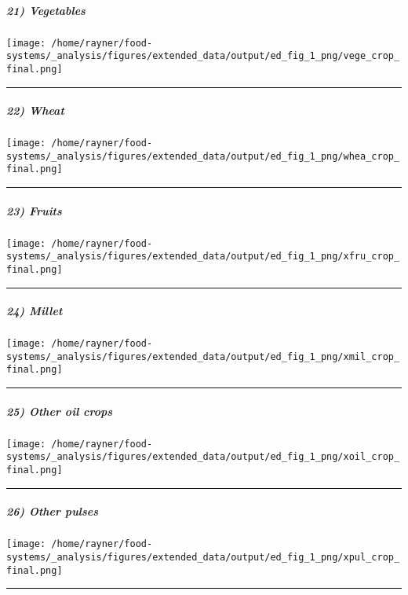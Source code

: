 \documentclass[
]{article}
\begin{document}
\hypertarget{vegetables}{%
\subparagraph{21) Vegetables}\label{vegetables}}

\texttt{[image: /home/rayner/food-systems/\_analysis/figures/extended\_data/output/ed\_fig\_1\_png/vege\_crop\_final.png]}

\begin{center}\rule{0.5\linewidth}{0.5pt}\end{center}

\hypertarget{wheat}{%
\subparagraph{22) Wheat}\label{wheat}}

\texttt{[image: /home/rayner/food-systems/\_analysis/figures/extended\_data/output/ed\_fig\_1\_png/whea\_crop\_final.png]}

\begin{center}\rule{0.5\linewidth}{0.5pt}\end{center}

\hypertarget{fruits}{%
\subparagraph{23) Fruits}\label{fruits}}

\texttt{[image: /home/rayner/food-systems/\_analysis/figures/extended\_data/output/ed\_fig\_1\_png/xfru\_crop\_final.png]}

\begin{center}\rule{0.5\linewidth}{0.5pt}\end{center}

\hypertarget{millet}{%
\subparagraph{24) Millet}\label{millet}}

\texttt{[image: /home/rayner/food-systems/\_analysis/figures/extended\_data/output/ed\_fig\_1\_png/xmil\_crop\_final.png]}

\begin{center}\rule{0.5\linewidth}{0.5pt}\end{center}

\hypertarget{other-oil-crops}{%
\subparagraph{25) Other oil crops}\label{other-oil-crops}}

\texttt{[image: /home/rayner/food-systems/\_analysis/figures/extended\_data/output/ed\_fig\_1\_png/xoil\_crop\_final.png]}

\begin{center}\rule{0.5\linewidth}{0.5pt}\end{center}

\hypertarget{other-pulses}{%
\subparagraph{26) Other pulses}\label{other-pulses}}

\texttt{[image: /home/rayner/food-systems/\_analysis/figures/extended\_data/output/ed\_fig\_1\_png/xpul\_crop\_final.png]}

\begin{center}\rule{0.5\linewidth}{0.5pt}\end{center}
\end{document}
